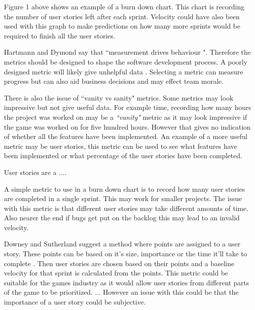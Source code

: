 \documentclass{scrartcl}
\begin{document}
Figure 1 above shows an example of a burn down chart. This chart is recording the number of user stories left after each sprint. Velocity could have also been used with this graph to make predictions on how many more sprints would be required to finish all the user stories.


Hartmann and Dymond say that ``measurement drives behaviour "\cite{Hartmann}.  %
Therefore the metrics should be designed to shape the software development process. A poorly designed metric will likely give unhelpful data \cite{Ktata}.  Selecting a metric can measure progress but can also aid business decisions and may effect team morale. %

There is also the issue of ``vanity vs sanity" metrics. Some metrics may look impressive but not give useful data. For example time, recording how many hours the project was worked on may be a \textit{``vanity"} metric as it may look impressive if the game was worked on for five hundred hours. However that gives no indication of whether all the features have been implemented. An example of a more useful metric may be user stories, this metric can be used to see what features have been implemented or what percentage of the user stories have been completed.


User stories are a ....

A simple metric to use in a burn down chart is to record how many user stories are completed in a single sprint. This may work for smaller projects. The issue with this metric is that different user stories may take different amounts of time. Also nearer the end if bugs get put on the backlog this may lead to an invalid velocity. %



Downey and Sutherland suggest a method where points are assigned to a user story. These points can be based on it's size, importance or the time it'll take to complete \cite{Downey}. Then user stories are chosen based on their points and a baseline velocity for that sprint is calculated from the points. This metric could be suitable for the games industry as it would allow user stories from different parts of the game to be prioritized. ... However an issue with this could be that the importance of a user story could be subjective. 
\end{document}
